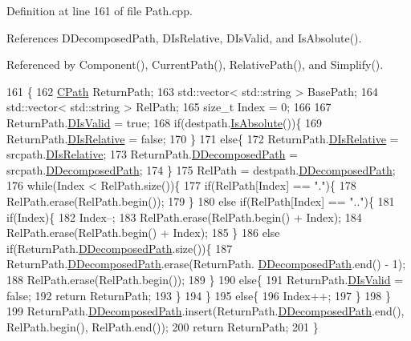 Definition at line 161 of file Path.\+cpp.



References D\+Decomposed\+Path, D\+Is\+Relative, D\+Is\+Valid, and Is\+Absolute().



Referenced by Component(), Current\+Path(), Relative\+Path(), and Simplify().


\begin{DoxyCode}
161                                                                     \{
162     \hyperlink{classCPath}{CPath} ReturnPath;
163     std::vector< std::string > BasePath;
164     std::vector< std::string > RelPath;
165     \textcolor{keywordtype}{size\_t} Index = 0;
166 
167     ReturnPath.\hyperlink{classCPath_a992aca27a1cba1c3bae3d04438821192}{DIsValid} = \textcolor{keyword}{true};
168     \textcolor{keywordflow}{if}(destpath.\hyperlink{classCPath_a613d8d4c4b72dba9fc8b6e487f583d7d}{IsAbsolute}())\{
169        ReturnPath.\hyperlink{classCPath_af705ff149bb2281c67afb84fff550eb9}{DIsRelative} = \textcolor{keyword}{false};
170     \}
171     \textcolor{keywordflow}{else}\{
172         ReturnPath.\hyperlink{classCPath_af705ff149bb2281c67afb84fff550eb9}{DIsRelative} = srcpath.\hyperlink{classCPath_af705ff149bb2281c67afb84fff550eb9}{DIsRelative};
173         ReturnPath.\hyperlink{classCPath_a03ed25209a01e633c107a0c877fc61f8}{DDecomposedPath} = srcpath.\hyperlink{classCPath_a03ed25209a01e633c107a0c877fc61f8}{DDecomposedPath};
174     \}
175     RelPath = destpath.\hyperlink{classCPath_a03ed25209a01e633c107a0c877fc61f8}{DDecomposedPath};
176     \textcolor{keywordflow}{while}(Index  < RelPath.size())\{
177         \textcolor{keywordflow}{if}(RelPath[Index] == \textcolor{stringliteral}{"."})\{
178             RelPath.erase(RelPath.begin());
179         \}
180         \textcolor{keywordflow}{else} \textcolor{keywordflow}{if}(RelPath[Index] == \textcolor{stringliteral}{".."})\{
181             \textcolor{keywordflow}{if}(Index)\{
182                 Index--;
183                 RelPath.erase(RelPath.begin() + Index);
184                 RelPath.erase(RelPath.begin() + Index);
185             \}
186             \textcolor{keywordflow}{else} \textcolor{keywordflow}{if}(ReturnPath.\hyperlink{classCPath_a03ed25209a01e633c107a0c877fc61f8}{DDecomposedPath}.size())\{
187                 ReturnPath.\hyperlink{classCPath_a03ed25209a01e633c107a0c877fc61f8}{DDecomposedPath}.erase(ReturnPath.
      \hyperlink{classCPath_a03ed25209a01e633c107a0c877fc61f8}{DDecomposedPath}.end() - 1);
188                 RelPath.erase(RelPath.begin());
189             \}
190             \textcolor{keywordflow}{else}\{
191                 ReturnPath.\hyperlink{classCPath_a992aca27a1cba1c3bae3d04438821192}{DIsValid} = \textcolor{keyword}{false};
192                 \textcolor{keywordflow}{return} ReturnPath;
193             \}
194         \}
195         \textcolor{keywordflow}{else}\{
196             Index++;
197         \}
198     \}    
199     ReturnPath.\hyperlink{classCPath_a03ed25209a01e633c107a0c877fc61f8}{DDecomposedPath}.insert(ReturnPath.\hyperlink{classCPath_a03ed25209a01e633c107a0c877fc61f8}{DDecomposedPath}.end(), 
      RelPath.begin(), RelPath.end());
200     \textcolor{keywordflow}{return} ReturnPath;
201 \}
\end{DoxyCode}
